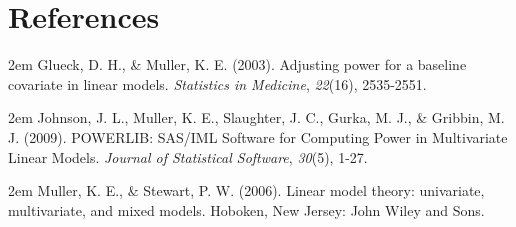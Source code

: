 \documentclass{glimmpse-report}
\begin{document}
\section*{References}

\hangindent2em
 Glueck, D. H., \& Muller, K. E. (2003). Adjusting power for a baseline covariate in linear models. \emph{Statistics in Medicine}, \emph{22}(16), 2535-2551.

\hangindent2em
 Johnson, J. L., Muller, K. E., Slaughter, J. C., Gurka, M. J., \& Gribbin, M. J. (2009). POWERLIB: SAS/IML Software for Computing Power in Multivariate Linear Models. \emph{Journal of Statistical Software}, \emph{30}(5), 1-27.

\hangindent2em
 Muller, K. E., \& Stewart, P. W. (2006). Linear model theory: univariate, multivariate, and mixed models. Hoboken, New Jersey: John Wiley and Sons.
\end{document}
